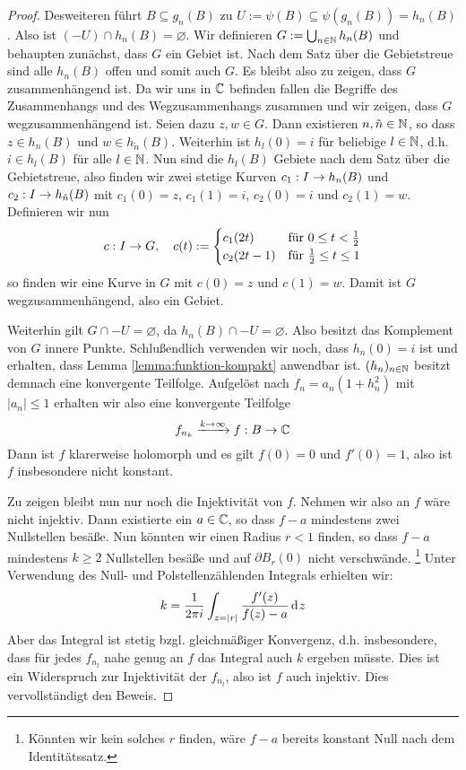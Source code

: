 \begin{proof}
  Desweiteren führt $B \subseteq g_n(B)$ zu $U:= \psi(B) \subseteq
  \psi(g_n(B)) = h_n(B)$. Also ist $(-U) \cap h_n(B) = \varnothing$.
  Wir definieren $G := \bigcup_{n \in \mathbb{N}} h_n(B)$ und behaupten
  zunächst, dass $G$ ein Gebiet ist.
  Nach dem Satz über die Gebietstreue sind alle $h_n(B)$ offen und
  somit auch $G$. Es bleibt also zu zeigen, dass $G$ zusammenhängend
  ist. Da wir uns in $\mathbb{C}$ befinden fallen die Begriffe des
  Zusammenhangs und des Wegzusammenhangs zusammen und wir zeigen, dass
  $G$ wegzusammenhängend ist.
  Seien dazu $z, w \in G$. Dann existieren $n, \tilde n \in \mathbb{N}$, so
  dass $z \in h_n(B)$ und $w \in h_{\tilde n} (B)$. Weiterhin ist
  $h_l(0) = i$ für beliebige $l \in \mathbb{N}$, d.h. $i \in h_l(B)$ für alle
  $l \in \mathbb{N}$. Nun sind die $h_l(B)$ Gebiete nach dem Satz über
  die Gebietstreue, also finden wir zwei stetige Kurven $c_1: I \rightarrow
  h_n(B)$ und $c_2: I \rightarrow h_{\tilde n}(B)$ mit $c_1(0) = z$, $c_1(1) =
  i$, $c_2(0) = i$ und $c_2(1) = w$. Definieren wir nun
  \[
  c: I \rightarrow G, \quad c(t) :=
  \begin{cases}
    c_1(2t) & \text{für } 0 \leq t < \frac12\\
    c_2(2t-1) & \text{für } \frac12 \leq t \leq 1
  \end{cases}
  \]
  so finden wir eine Kurve in $G$ mit $c(0) = z$ und $c(1) = w$. Damit
  ist $G$ wegzusammenhängend, also ein Gebiet.

  Weiterhin gilt $G \cap -U = \varnothing$, da $h_n(B) \cap -U =
  \varnothing$. Also besitzt das Komplement von $G$ innere Punkte.
  Schlußendlich verwenden wir noch, dass $h_n(0) = i$ ist und
  erhalten, dass Lemma \ref{lemma:funktion-kompakt} anwendbar ist.
  $(h_n)_{n \in \mathbb{N}}$ besitzt demnach
  eine konvergente Teilfolge. Aufgelöst nach $f_n =
  a_n(1 + h_n^2)$ mit $|a_n| \leq 1$ erhalten wir also eine
  konvergente Teilfolge
  \[
  f_{n_k} \xrightarrow{k \rightarrow \infty} f: B \rightarrow \mathbb{C}
  \]
  Dann ist $f$ klarerweise holomorph und es gilt $f(0) = 0$ und $f'(0)
  = 1$, also ist $f$ insbesondere nicht konstant.

  Zu zeigen bleibt nun nur noch die Injektivität von $f$.
  Nehmen wir also an $f$ wäre nicht injektiv. Dann existierte ein $a \in \mathbb{C}$,
  so dass $f-a$ mindestens zwei Nullstellen besäße. Nun könnten wir
  einen Radius $r < 1$ finden, so dass $f-a$ mindestens $k\geq 2$
  Nullstellen besäße und auf $\partial B_r(0)$ nicht
  verschwände. \footnote{Könnten wir kein solches $r$ finden, wäre $f-a$
  bereits konstant Null nach dem Identitätssatz.} Unter Verwendung des
  Null- und Polstellenzählenden Integrals erhielten wir:
  \[
  k = \frac1{2\pi i} \int_{z = |r|} \frac{f'(z)}{f(z) - a} \d[z]
  \]
  Aber das Integral ist stetig bzgl. gleichmäßiger Konvergenz,
  d.h. insbesondere, dass für jedes $f_{n_l}$ nahe genug an $f$ das
  Integral auch $k$ ergeben müsste. Dies ist ein Widerspruch zur
  Injektivität der $f_{n_l}$, also ist $f$ auch injektiv. 
  Dies vervollständigt den Beweis.
\end{proof}

